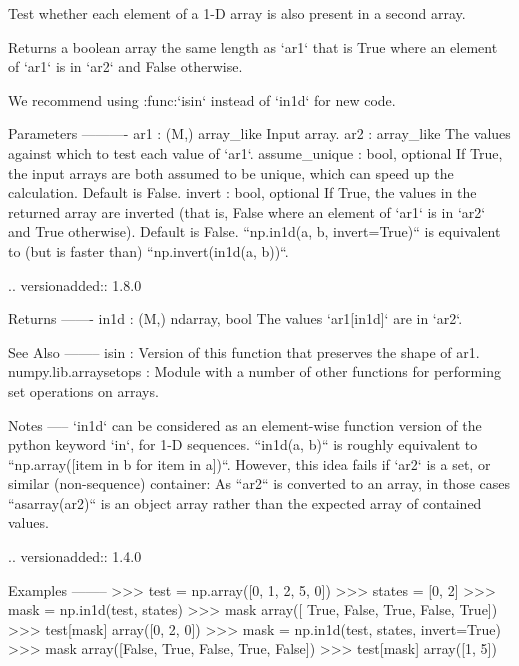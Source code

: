 \begin{DoxyVerb}Test whether each element of a 1-D array is also present in a second array.

Returns a boolean array the same length as `ar1` that is True
where an element of `ar1` is in `ar2` and False otherwise.

We recommend using :func:`isin` instead of `in1d` for new code.

Parameters
----------
ar1 : (M,) array_like
    Input array.
ar2 : array_like
    The values against which to test each value of `ar1`.
assume_unique : bool, optional
    If True, the input arrays are both assumed to be unique, which
    can speed up the calculation.  Default is False.
invert : bool, optional
    If True, the values in the returned array are inverted (that is,
    False where an element of `ar1` is in `ar2` and True otherwise).
    Default is False. ``np.in1d(a, b, invert=True)`` is equivalent
    to (but is faster than) ``np.invert(in1d(a, b))``.

    .. versionadded:: 1.8.0

Returns
-------
in1d : (M,) ndarray, bool
    The values `ar1[in1d]` are in `ar2`.

See Also
--------
isin                  : Version of this function that preserves the
                        shape of ar1.
numpy.lib.arraysetops : Module with a number of other functions for
                        performing set operations on arrays.

Notes
-----
`in1d` can be considered as an element-wise function version of the
python keyword `in`, for 1-D sequences. ``in1d(a, b)`` is roughly
equivalent to ``np.array([item in b for item in a])``.
However, this idea fails if `ar2` is a set, or similar (non-sequence)
container:  As ``ar2`` is converted to an array, in those cases
``asarray(ar2)`` is an object array rather than the expected array of
contained values.

.. versionadded:: 1.4.0

Examples
--------
>>> test = np.array([0, 1, 2, 5, 0])
>>> states = [0, 2]
>>> mask = np.in1d(test, states)
>>> mask
array([ True, False,  True, False,  True])
>>> test[mask]
array([0, 2, 0])
>>> mask = np.in1d(test, states, invert=True)
>>> mask
array([False,  True, False,  True, False])
>>> test[mask]
array([1, 5])
\end{DoxyVerb}
 \mbox{\label{namespacenumpy_1_1lib_1_1arraysetops_a9231040ecb3b9a1be9f2c7f4ab965eff}} 
